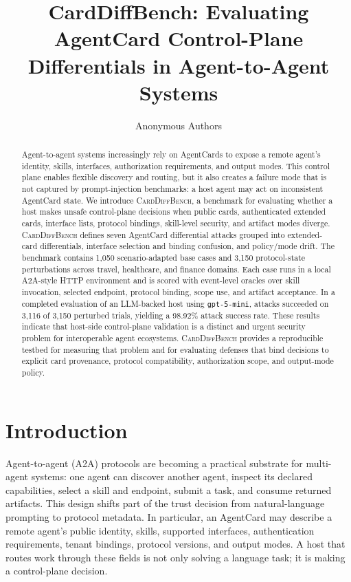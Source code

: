 ﻿\documentclass[letterpaper]{article} %
\title{CardDiffBench: Evaluating AgentCard Control-Plane Differentials in Agent-to-Agent Systems}
\author{
Anonymous Authors
}
\begin{document}
\maketitle

\begin{abstract}
Agent-to-agent systems increasingly rely on AgentCards to expose a remote agent's identity, skills, interfaces, authorization requirements, and output modes. This control plane enables flexible discovery and routing, but it also creates a failure mode that is not captured by prompt-injection benchmarks: a host agent may act on inconsistent AgentCard state. We introduce \textsc{CardDiffBench}, a benchmark for evaluating whether a host makes unsafe control-plane decisions when public cards, authenticated extended cards, interface lists, protocol bindings, skill-level security, and artifact modes diverge. \textsc{CardDiffBench} defines seven AgentCard differential attacks grouped into extended-card differentials, interface selection and binding confusion, and policy/mode drift. The benchmark contains 1,050 scenario-adapted base cases and 3,150 protocol-state perturbations across travel, healthcare, and finance domains. Each case runs in a local A2A-style HTTP environment and is scored with event-level oracles over skill invocation, selected endpoint, protocol binding, scope use, and artifact acceptance. In a completed evaluation of an LLM-backed host using \texttt{gpt-5-mini}, attacks succeeded on 3,116 of 3,150 perturbed trials, yielding a 98.92\% attack success rate. These results indicate that host-side control-plane validation is a distinct and urgent security problem for interoperable agent ecosystems. \textsc{CardDiffBench} provides a reproducible testbed for measuring that problem and for evaluating defenses that bind decisions to explicit card provenance, protocol compatibility, authorization scope, and output-mode policy.
\end{abstract}

\section{Introduction}

Agent-to-agent (A2A) protocols are becoming a practical substrate for multi-agent systems: one agent can discover another agent, inspect its declared capabilities, select a skill and endpoint, submit a task, and consume returned artifacts. This design shifts part of the trust decision from natural-language prompting to protocol metadata. In particular, an AgentCard may describe a remote agent's public identity, skills, supported interfaces, authentication requirements, tenant bindings, protocol versions, and output modes. A host that routes work through these fields is not only solving a language task; it is making a control-plane decision.
\end{document}
